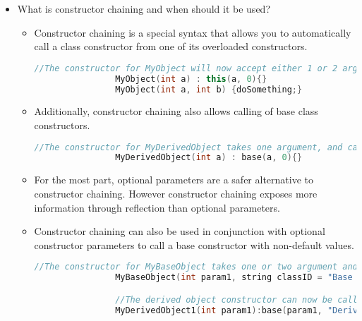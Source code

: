 \documentclass{article}
\begin{document}
\begin{itemize}
\begin{itemize}
\begin{lstlisting}[language=C++]
                //Using optional parameters, named arguments, and tuple syntax
                myConstructor(int param1, int param2=0) => (field1, field2) = (param1, param2);
                myObject = new MyObject(param1: 1);
                myObject = new MyObject(param1: 1, param2: 15);
                \end{lstlisting}
    \end{itemize}
    \item What is constructor chaining and when should it be used?
    \begin{itemize}
        \item Constructor chaining is a special syntax that allows you to automatically call a class constructor from one of its overloaded constructors.
        \begin{lstlisting}[language=C++]
                //The constructor for MyObject will now accept either 1 or 2 arguments, with the             single argument constructor calling the double argument constructor with 0 as                the second argument 
                MyObject(int a) : this(a, 0){}
                MyObject(int a, int b) {doSomething;}
                \end{lstlisting}
        \item Additionally, constructor chaining also allows calling of base class constructors.
        \begin{lstlisting}[language=C++]
                //The constructor for MyDerivedObject takes one argument, and calls the two                  argument constructor of the base class with 0 as the second argument.
                MyDerivedObject(int a) : base(a, 0){}
                \end{lstlisting}
        \item For the most part, optional parameters are a safer alternative to constructor chaining. However constructor chaining exposes more information through reflection than optional parameters.
        \item Constructor chaining can also be used in conjunction with optional constructor parameters to call a base constructor with non-default values.
        \begin{lstlisting}[language=C++]
                //The constructor for MyBaseObject takes one or two argument and defaults the                second optional argument to 0
                MyBaseObject(int param1, string classID = "Base Class") {doSomething;}

                //The derived object constructor can now be called with one parameter, while                 passing a set value that differs from the base default to the base constructor               for the second argument
                MyDerivedObject1(int param1):base(param1, "Derived Class 1"){}


\end{lstlisting}
\end{itemize}
\end{itemize}
\end{document}
